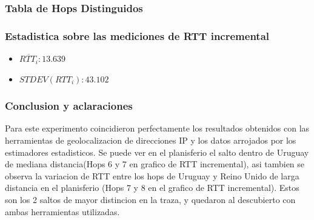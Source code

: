 \subsubsection{Tabla de Hops Distinguidos}
\begin{center}
\end{center}

\subsubsection{Estadistica sobre las mediciones de RTT incremental}
\begin{itemize}
	\item $\overline{RTT_i}: 13.639$
	\item $STDEV(RTT_i): 43.102$
\end{itemize}

\subsubsection{Conclusion y aclaraciones}
Para este experimento coincidieron perfectamente los resultados obtenidos con las herramientas de geolocalizacion de direcciones IP y los datos arrojados por los estimadores estadisticos. Se puede ver en el planisferio el salto dentro de Uruguay de mediana distancia(Hops 6 y 7 en grafico de RTT incremental), asi tambien se observa la variacion de RTT entre los hops de Uruguay y Reino Unido de larga distancia en el planisferio (Hops 7 y 8 en el grafico de RTT incremental). Estos son los 2 saltos de mayor distincion en la traza, y quedaron al descubierto con ambas herramientas utilizadas.
